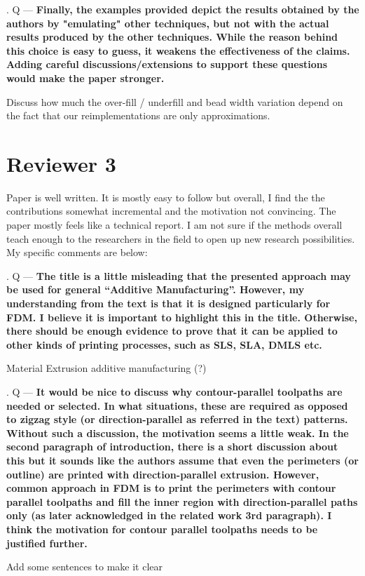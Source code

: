 \documentclass[5p,twocolumn,10pt,times]{elsarticle}
\theoremstyle{definition}
\newcommand\Que[1]{%
   \leavevmode\par
   \stepcounter{question}
   \noindent
   \thequestion. Q --- {\bf#1}\par}
\newcounter{question}
\numberwithin{question}{section}
\begin{document}
\Que{
Finally, the examples provided depict the results obtained by the authors by "emulating" other techniques, but not with the actual results produced by the other techniques. While the reason behind this choice is easy to guess, it weakens the effectiveness of the claims. Adding careful discussions/extensions to support these questions would make the paper stronger.
}
Discuss how much the over-fill / underfill and bead width variation depend on the fact that our reimplementations are only approximations.






\section{Reviewer 3}
Paper is well written. It is mostly easy to follow but overall, I find the the contributions somewhat incremental and the motivation not convincing. The paper mostly feels like a technical report. I am not sure if the methods overall teach enough to the researchers in the field to open up new research possibilities. My specific comments are below: 

\Que{
The title is a little misleading that the presented approach may be used for general “Additive Manufacturing”. However, my understanding from the text is that it is designed particularly for FDM. I believe it is important to highlight this in the title. Otherwise, there should be enough evidence to prove that it can be applied to other kinds of printing processes, such as SLS, SLA, DMLS etc. 
}
Material Extrusion additive manufacturing (?)

\Que{
It would be nice to discuss why contour-parallel toolpaths are needed or selected. In what situations, these are required as opposed to zigzag style (or direction-parallel as referred in the text) patterns. Without such a discussion, the motivation seems a little weak. In the second paragraph of introduction, there is a short discussion about this but it sounds like the authors assume that even the perimeters (or outline) are printed with direction-parallel extrusion. However, common approach in FDM is to print the perimeters with contour parallel toolpaths and fill the inner region with direction-parallel paths only (as later acknowledged in the related work 3rd paragraph). I think the motivation for contour parallel toolpaths needs to be justified further. 
}

Add some sentences to make it clear
\end{document}
